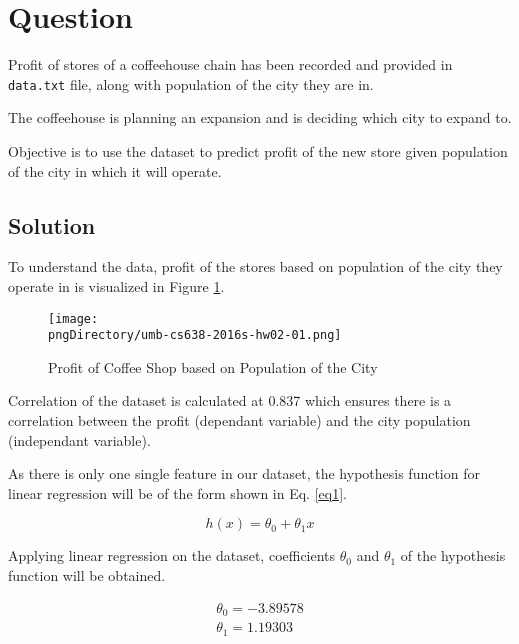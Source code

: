 \documentclass[12pt,letterpaper,twoside]{article}
\begin{document}

\makeHeader

\section*{Question}

Profit of stores of a coffeehouse chain has been recorded and provided in \texttt{data.txt} file, along with population of the city they are in.

The coffeehouse is planning an expansion and is deciding which city to expand to.

Objective is to use the dataset to predict profit of the new store given population of the city in which it will operate.

\subsection*{Solution}

To understand the data, profit of the stores based on population of the city they operate in is visualized in Figure \ref{fig1}.

\begin{figure}[H]\centering
\texttt{[image: \\pngDirectory/umb-cs638-2016s-hw02-01.png]}
\caption{Profit of Coffee Shop based on Population of the City}\label{fig1}
\end{figure}

Correlation of the dataset is calculated at 0.837 which ensures there is a correlation between the profit (dependant variable) and the city population (independant variable).

As there is only one single feature in our dataset, the hypothesis function for linear regression will be of the form shown in Eq. \ref{eq1}.

\begin{equation}\label{eq1}
h(x) = \theta_0 + \theta_1 x
\end{equation}

Applying linear regression on the dataset, coefficients $\theta_0$ and $\theta_1$ of the hypothesis function will be obtained.

\begin{equation}\label{eq2}
\begin{split}
\theta_0 = -3.89578\\
\theta_1 = 1.19303
\end{split}
\end{equation}
\end{document}
